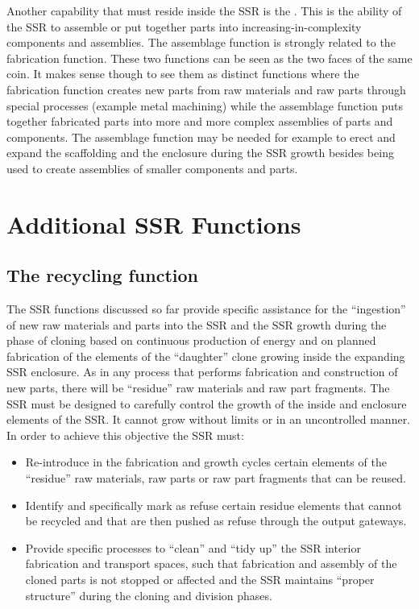Another capability that must
reside inside the SSR is the . This is the
ability of the SSR to assemble or put together parts into
increasing-in-complexity components and assemblies. The assemblage
function is strongly related to the fabrication function. These two
functions can be seen as the two faces of the same coin. It makes sense
though to see them as distinct functions where the fabrication function
creates new parts from raw materials and raw parts through special
processes (example metal machining) while the assemblage function puts
together fabricated parts into more and more complex assemblies of
parts and components. The assemblage function may be needed for example
to erect and expand the scaffolding and the enclosure during the SSR
growth besides being used to create assemblies of smaller components
and parts.

\section{Additional SSR Functions}

\subsection[The recycling function]{The recycling function}

The SSR functions discussed so
far provide specific assistance for the “ingestion” of new raw
materials and parts into the SSR and the SSR growth during the phase of
cloning based on continuous production of energy and on planned
fabrication of the elements of the “daughter” clone growing inside the
expanding SSR enclosure. As in any process that performs fabrication
and construction of new parts, there will be “residue” raw materials
and raw part fragments.  The SSR must be designed to carefully control
the growth of the inside and enclosure elements of the SSR. It cannot
grow without limits or in an uncontrolled manner. In order to achieve
this objective the SSR must:

\begin{itemize}
\item Re-introduce in the fabrication and growth cycles certain elements
of the “residue” raw materials, raw parts or raw part fragments that
can be reused.
\item Identify and specifically mark as refuse certain residue elements
that cannot be recycled and that are then pushed as refuse through the
output gateways.
\item Provide specific processes to “clean” and “tidy up” the SSR
interior fabrication and transport spaces, such that fabrication and
assembly of the cloned parts is not stopped or affected and the SSR
maintains “proper structure” during the cloning and division phases.
\end{itemize}

